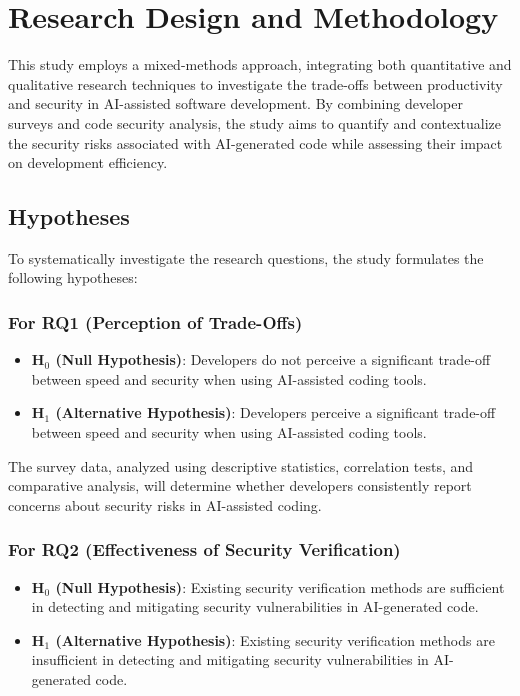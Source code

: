 \section{Research Design and Methodology}
This study employs a mixed-methods approach, integrating both quantitative and qualitative research techniques to investigate the trade-offs between productivity and security in AI-assisted software development. By combining developer surveys and code security analysis, the study aims to quantify and contextualize the security risks associated with AI-generated code while assessing their impact on development efficiency.

\subsection{Hypotheses}

To systematically investigate the research questions, the study formulates the following hypotheses:

\subsubsection{For RQ1 (Perception of Trade-Offs)}

\begin{itemize}
    \item \textbf{H$_{0}$ (Null Hypothesis)}: Developers do not perceive a significant trade-off between speed and security when using AI-assisted coding tools.
    \item \textbf{H$_{1}$ (Alternative Hypothesis)}: Developers perceive a significant trade-off between speed and security when using AI-assisted coding tools.
\end{itemize}

The survey data, analyzed using descriptive statistics, correlation tests, and comparative analysis, will determine whether developers consistently report concerns about security risks in AI-assisted coding.

\subsubsection{For RQ2 (Effectiveness of Security Verification)}

\begin{itemize}
    \item \textbf{H$_{0}$ (Null Hypothesis)}: Existing security verification methods are sufficient in detecting and mitigating security vulnerabilities in AI-generated code.
    \item \textbf{H$_{1}$ (Alternative Hypothesis)}: Existing security verification methods are insufficient in detecting and mitigating security vulnerabilities in AI-generated code.
\end{itemize}


